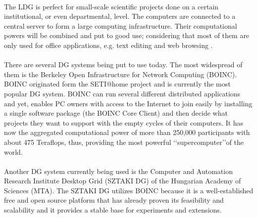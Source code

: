 \documentclass[10pt, twocolumn, letterpaper]{article}
\begin{document}
\paragraph{}
The LDG is perfect for small-scale scientific projects done on a certain institutional, or even departmental, level. The computers are connected to a central server to form a large computing infrastructure. Their computational powers will be combined and put to good use; considering that most of them are only used for office applications, e.g. text editing and web browsing \cite{desktopgrid.hu}.

\paragraph{}
There are several DG systems being put to use today. The most widespread of them is the Berkeley Open Infrastructure for Network Computing (BOINC). BOINC originated form the SETI@home project and is currently the most popular DG system. BOINC can run several different distributed applications and yet, enables PC owners with access to the Internet to join easily by installing a single software package (the BOINC Core Client) and then decide what projects they want to support with the empty cycles of their computers. It has now the aggregated computational power of more than 250,000 participants with about 475 Teraflops, thus, providing the most powerful \lq\lq supercomputer\rq\rq of the world.

\paragraph{}
Another DG system currently being used is the Computer and Automation Research Institute Desktop Grid (SZTAKI DG) of the Hungarian Academy of Sciences (MTA). The SZTAKI DG utilizes BOINC because it is a well-established free and open source platform that has already proven its feasibility and scalability and it provides a stable base for experiments and extensions.
\end{document}
